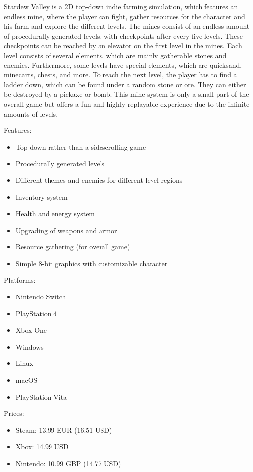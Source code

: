 \documentclass[12p]{article}
\begin{document}
Stardew Valley is a 2D top-down indie farming simulation, which features an endless mine, where the player can fight, gather resources for the character and his farm and explore the different levels. The mines consist of an endless amount of procedurally generated levels, with checkpoints after every five levels. These checkpoints can be reached by an elevator on the first level in the mines. Each level consists of several elements, which are mainly gatherable stones and enemies. Furthermore, some levels have special elements, which are quicksand, minecarts, chests, and more. To reach the next level, the player has to find a ladder down, which can be found under a random stone or ore. They can either be destroyed by a pickaxe or bomb. This mine system is only a small part of the overall game but offers a fun and highly replayable experience due to the infinite amounts of levels.

Features:

\begin{itemize}
  \item Top-down rather than a sidescrolling game
  \item Procedurally generated levels
  \item Different themes and enemies for different level regions
  \item Inventory system
  \item Health and energy system
  \item Upgrading of weapons and armor
  \item Resource gathering (for overall game)
  \item Simple 8-bit graphics with customizable character
\end{itemize}

\newpage

Platforms:

\begin{itemize}
    \item Nintendo Switch
    \item PlayStation 4
    \item Xbox One
    \item Windows
    \item Linux
    \item macOS
    \item PlayStation Vita
\end{itemize}

Prices:

\begin{itemize}
  \item Steam: 13.99 EUR (16.51 USD)
  \item Xbox: 14.99 USD
  \item Nintendo: 10.99 GBP (14.77 USD)
\end{itemize}
\end{document}
